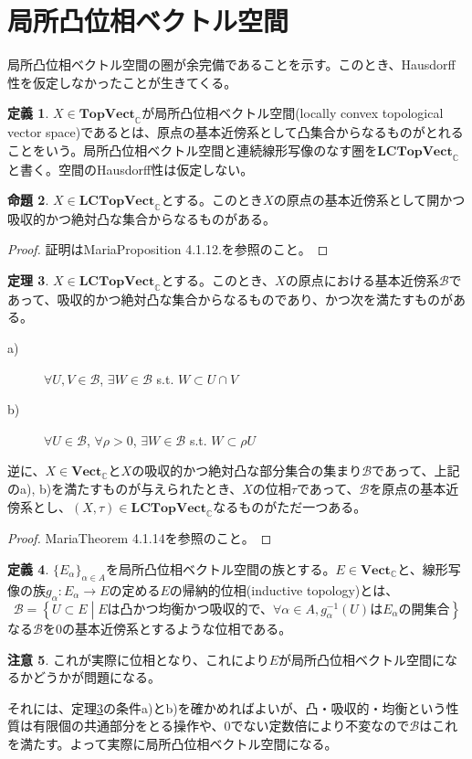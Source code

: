 ﻿\documentclass[12pt]{jsarticle}
\newcommand{\C}{\mathbb{C}}
\newcommand{\Vect}{\textbf{Vect}_{\C}}
\newcommand{\TopVect}{\textbf{TopVect}_{\C}}
\newcommand{\LCTopVect}{\textbf{LCTopVect}_{\C}}
\newcommand{\B}{\mathcal{B}}
\newcommand{\setmid}[2]{\left\{ #1 \mathrel{} \middle| \mathrel{} #2 \right\}}%
\theoremstyle{definition}%
\newtheorem{definition}{定義}[section]%
\newtheorem{theorem}[definition]{定理}
\newtheorem{proposition}[definition]{命題}
\newtheorem{remark}[definition]{注意}
\renewenvironment{leftbar}{%
  \renewcommand\FrameCommand{\vrule width 1pt \hspace{10pt}}%
  \MakeFramed {\advance\hsize-\width \FrameRestore}}
 {\endMakeFramed}
\newenvironment{bardefinition}{ \begin{definition} \begin{leftbar}} {\end{leftbar} \end{definition}}
\begin{document}
\newpage
\section{局所凸位相ベクトル空間}
局所凸位相ベクトル空間の圏が余完備であることを示す。このとき、Hausdorff性を仮定しなかったことが生きてくる。

\begin{bardefinition}
  $X \in \TopVect$が局所凸位相ベクトル空間(locally convex topological vector space)であるとは、原点の基本近傍系として凸集合からなるものがとれることをいう。局所凸位相ベクトル空間と連続線形写像のなす圏を$\LCTopVect$と書く。空間のHausdorff性は仮定しない。
\end{bardefinition}

\begin{proposition}
  $X \in \LCTopVect$とする。このとき$X$の原点の基本近傍系として開かつ吸収的かつ絶対凸な集合からなるものがある。
\end{proposition}
\begin{proof}
  証明はMaria\cite{Maria-I}Proposition 4.1.12.を参照のこと。
\end{proof}


\begin{theorem}\label{theorem:lctvs}
  $X \in \LCTopVect$とする。このとき、$X$の原点における基本近傍系$\mathcal{B}$であって、吸収的かつ絶対凸な集合からなるものであり、かつ次を満たすものがある。
\begin{description}
  \item[a)]$\forall U,V \in \B$, $\exists W \in \B$ s.t. $W \subset U \cap V$
  \item[b)]$\forall U \in \B$, $\forall \rho > 0$, $\exists W \in \B$ s.t. $W \subset \rho U$
\end{description}
逆に、$X \in \Vect$と$X$の吸収的かつ絶対凸な部分集合の集まり$\B$であって、上記のa), b)を満たすものが与えられたとき、$X$の位相$\tau$であって、$\B$を原点の基本近傍系とし、$(X,\tau) \in \LCTopVect$なるものがただ一つある。
\end{theorem}
\begin{proof}
Maria\cite{Maria-I}Theorem 4.1.14を参照のこと。
\end{proof}

\begin{bardefinition}
  $\{ E_{\alpha} \}_{\alpha \in A}$を局所凸位相ベクトル空間の族とする。$E \in \Vect$と、線形写像の族$g_{\alpha} \colon E_{\alpha} \to E$の定める$E$の帰納的位相(inductive topology)とは、
  \[
  \B = \setmid{U \subset E}{E \text{は凸かつ均衡かつ吸収的で、} \forall \alpha \in A , g_{\alpha}^{-1} (U) \text{は} E_{\alpha} \text{の開集合} }
  \]
  なる$\B$を0の基本近傍系とするような位相である。
\end{bardefinition}
\begin{remark}
  これが実際に位相となり、これにより$E$が局所凸位相ベクトル空間になるかどうかが問題になる。

  それには、定理\ref{theorem:lctvs}の条件a)とb)を確かめればよいが、凸・吸収的・均衡という性質は有限個の共通部分をとる操作や、0でない定数倍により不変なので$\B$はこれを満たす。よって実際に局所凸位相ベクトル空間になる。
\end{remark}
\end{document}
